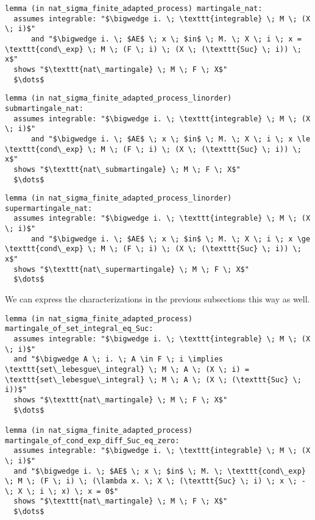 \begin{isalemma}
{\small
\begin{lstlisting}[style=isabelle]
lemma (in nat_sigma_finite_adapted_process) martingale_nat:
  assumes integrable: "$\bigwedge i. \; \texttt{integrable} \; M \; (X \; i)$" 
      and "$\bigwedge i. \; $AE$ \; x \; $in$ \; M. \; X \; i \; x = \texttt{cond\_exp} \; M \; (F \; i) \; (X \; (\texttt{Suc} \; i)) \; x$" 
  shows "$\texttt{nat\_martingale} \; M \; F \; X$"
  $\dots$
\end{lstlisting}
}
\end{isalemma}

\begin{isalemma}
{\small
\begin{lstlisting}[style=isabelle]
lemma (in nat_sigma_finite_adapted_process_linorder) submartingale_nat:
  assumes integrable: "$\bigwedge i. \; \texttt{integrable} \; M \; (X \; i)$" 
      and "$\bigwedge i. \; $AE$ \; x \; $in$ \; M. \; X \; i \; x \le \texttt{cond\_exp} \; M \; (F \; i) \; (X \; (\texttt{Suc} \; i)) \; x$" 
  shows "$\texttt{nat\_submartingale} \; M \; F \; X$"
  $\dots$
\end{lstlisting}
}
\end{isalemma}

\begin{isalemma}
{\small
\begin{lstlisting}[style=isabelle]
lemma (in nat_sigma_finite_adapted_process_linorder) supermartingale_nat:
  assumes integrable: "$\bigwedge i. \; \texttt{integrable} \; M \; (X \; i)$" 
      and "$\bigwedge i. \; $AE$ \; x \; $in$ \; M. \; X \; i \; x \ge \texttt{cond\_exp} \; M \; (F \; i) \; (X \; (\texttt{Suc} \; i)) \; x$" 
  shows "$\texttt{nat\_supermartingale} \; M \; F \; X$"
  $\dots$
\end{lstlisting}
}
\end{isalemma}

We can express the characterizations in the previous subsections this way as well.

\begin{isalemma}
{\small
\begin{lstlisting}[style=isabelle]
lemma (in nat_sigma_finite_adapted_process) martingale_of_set_integral_eq_Suc:
  assumes integrable: "$\bigwedge i. \; \texttt{integrable} \; M \; (X \; i)$"
  and "$\bigwedge A \; i. \; A \in F \; i \implies \texttt{set\_lebesgue\_integral} \; M \; A \; (X \; i) = \texttt{set\_lebesgue\_integral} \; M \; A \; (X \; (\texttt{Suc} \; i))$" 
  shows "$\texttt{nat\_martingale} \; M \; F \; X$"
  $\dots$
  
lemma (in nat_sigma_finite_adapted_process) martingale_of_cond_exp_diff_Suc_eq_zero:
  assumes integrable: "$\bigwedge i. \; \texttt{integrable} \; M \; (X \; i)$" 
  and "$\bigwedge i. \; $AE$ \; x \; $in$ \; M. \; \texttt{cond\_exp} \; M \; (F \; i) \; (\lambda x. \; X \; (\texttt{Suc} \; i) \; x \; - \; X \; i \; x) \; x = 0$" 
  shows "$\texttt{nat\_martingale} \; M \; F \; X$"
  $\dots$
\end{lstlisting}
}
\end{isalemma}

